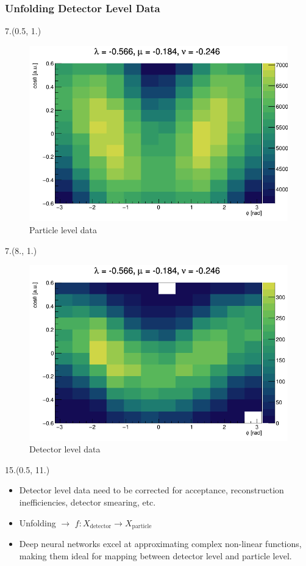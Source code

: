 \documentclass[12pt, xcolor={dvipsnames}, aspectratio = 169, sans, mathserif]{beamer}
\newenvironment{List}[2]
{\begin{textblock}{#1}#2
\begin{itemize}}
{\end{itemize}
\end{textblock}}
\newenvironment{Pic}[2]
{\begin{textblock}{#1}#2
\begin{figure}}
{\end{figure}
\end{textblock}}
\begin{document}
\begin{frame}
\frametitle{Unfolding Detector Level Data}

\begin{Pic}{7.}{(0.5, 1.)}
  \caption{Particle level data}
  \includegraphics[width=7.cm]{imgs/particle_level.png}
\end{Pic}

\begin{Pic}{7.}{(8., 1.)}
  \caption{Detector level data}
  \includegraphics[width=7.cm]{imgs/detector_level.png}
\end{Pic}

\begin{List}{15.}{(0.5, 11.)}

  \item Detector level data need to be corrected for acceptance, reconstruction inefficiencies, detector smearing, etc.

  \item Unfolding $\rightarrow$ $f: X_{\text{detector}} \rightarrow X_{\text{particle}}$

  \item Deep neural networks excel at approximating complex non-linear functions, making them ideal for mapping between detector level and particle level.
\end{List}

\end{frame}
\end{document}
